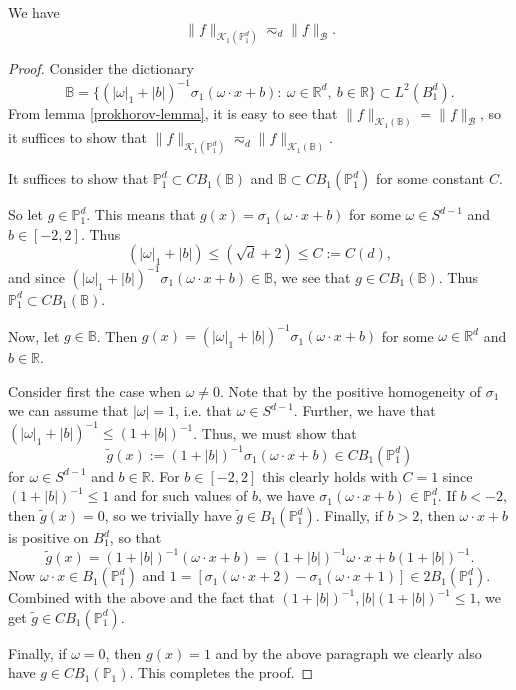 \begin{proposition}
 We have
 \begin{equation}
  \|f\|_{\mathcal{K}_1(\mathbb{P}^d_1)} \eqsim_d \|f\|_{\mathcal{B}}.
 \end{equation}

\end{proposition}
\begin{proof}
 Consider the dictionary
 \begin{equation}
 \mathbb{B} = \{(|\omega|_1 + |b|)^{-1}\sigma_1(\omega\cdot x + b):~\omega\in \mathbb{R}^d,~b\in \mathbb{R}\}\subset L^2(B_1^d).
\end{equation}
From lemma \ref{prokhorov-lemma}, it is easy to see that $\|f\|_{\mathcal{K}_1(\mathbb{B})} = \|f\|_{\mathcal{B}}$, so it suffices to show that $\|f\|_{\mathcal{K}_1(\mathbb{P}^d_1)} \eqsim_d \|f\|_{\mathcal{K}_1(\mathbb{B})}$.

 
 It suffices to show that $\mathbb{P}^d_1\subset CB_1(\mathbb{B})$ and $\mathbb{B}\subset CB_1(\mathbb{P}^d_1)$ for some constant $C$. 
 
 So let $g\in \mathbb{P}^d_1$. This means that $g(x) = \sigma_1(\omega \cdot x + b)$ for some $\omega\in S^{d-1}$ and $b\in [-2,2]$. Thus $$(|\omega|_1 + |b|) \leq (\sqrt{d} + 2) \leq C:=C(d),$$
 and since $(|\omega|_1 + |b|)^{-1}\sigma_1(\omega \cdot x + b)\in \mathbb{B}$, we see that $g\in CB_1(\mathbb{B})$. Thus $\mathbb{P}^d_1\subset CB_1(\mathbb{B})$.
 
 Now, let $g\in \mathbb{B}$. Then $g(x) = (|\omega|_1 + |b|)^{-1}\sigma_1(\omega \cdot x + b)$ for some $\omega\in \mathbb{R}^d$ and $b\in \mathbb{R}$. 
 
 Consider first the case when $\omega \neq 0$. Note that by the positive homogeneity of $\sigma_1$ we can assume that $|\omega| = 1$, i.e. that $\omega\in S^{d-1}$. Further, we have that $(|\omega|_1 + |b|)^{-1} \leq (1+|b|)^{-1}$. Thus, we must show that
 \begin{equation}
  \tilde g(x) := (1+|b|)^{-1}\sigma_1(\omega \cdot x + b)\in CB_1(\mathbb{P}^d_1) 
 \end{equation}
 for $\omega\in S^{d-1}$ and $b\in \mathbb{R}$. For $b\in [-2,2]$ this clearly holds with $C=1$ since $(1 + |b|)^{-1} \leq 1$ and for such values of $b$, we have $\sigma_1(\omega\cdot x + b)\in \mathbb{P}^d_1$. If $b < -2$, then $\tilde g(x) = 0$, so we trivially have $\tilde g\in B_1(\mathbb{P}^d_1)$. Finally, if $b > 2$, then $\omega\cdot x + b$ is positive on $B_1^d$, so that
 $$
 \tilde g(x) = (1+|b|)^{-1}(\omega\cdot x + b) = (1+|b|)^{-1}\omega\cdot x + b(1+|b|)^{-1}.
 $$
 Now $\omega\cdot x\in B_1(\mathbb{P}^d_1)$ and $1 = [\sigma_1(\omega\cdot x + 2) - \sigma_1(\omega\cdot x + 1)]\in 2 B_1(\mathbb{P}^d_1)$.
 Combined with the above and the fact that $(1+|b|)^{-1},|b|(1+|b|)^{-1}\leq 1$, we get $\tilde g\in CB_1(\mathbb{P}^d_1)$.
 
 Finally, if $\omega = 0$, then $g(x) = 1$ and by the above paragraph we clearly also have $g\in CB_1(\mathbb{P}_1)$. This completes the proof.
\end{proof}

